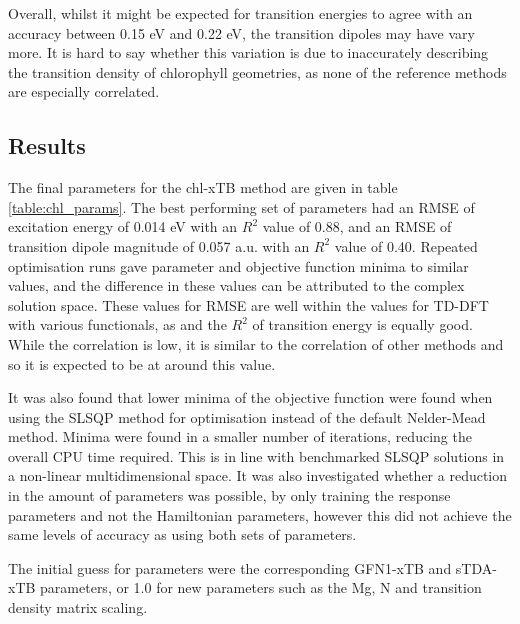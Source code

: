 Overall, whilst it might be expected for transition energies to agree with an accuracy 
between 0.15 eV and 0.22 eV, the transition dipoles may have vary more. It is hard
to say whether this variation is due to inaccurately describing the transition density
of chlorophyll geometries, as none of the reference methods are especially correlated.

\afterpartskip
\subsection{Results}
\label{subsec:chl_opt_results}

The final parameters for the chl-xTB method are given in table \ref{table:chl_params}.
The best performing set of parameters had an RMSE of excitation energy of 0.014 eV 
with an $R^2$ value of 0.88, and an RMSE of transition dipole magnitude of 0.057 a.u. 
with an $R^2$ value of 0.40. Repeated optimisation runs gave parameter and objective
function minima to similar values, and the difference in these values can be attributed
to the complex solution space. These values for RMSE are well within the values
for TD-DFT with various functionals, as and the $R^2$ of transition energy is equally
good. While the correlation is low, it is similar to the correlation of other methods
and so it is expected to be at around this value.

It was also found that lower minima of the objective function were found when using
the SLSQP method for optimisation instead of the default Nelder-Mead method. Minima
were found in a smaller number of iterations, reducing the overall CPU time required.
This is in line with benchmarked SLSQP solutions in a non-linear multidimensional space.
It was also investigated whether a reduction in the amount of parameters was possible,
by only training the response parameters and not the Hamiltonian parameters, however 
this did not achieve the same levels of accuracy as using both sets of parameters.

The initial guess for parameters were the corresponding GFN1-xTB and sTDA-xTB
parameters, or 1.0 for new parameters such as the Mg, N and transition density matrix
scaling.

